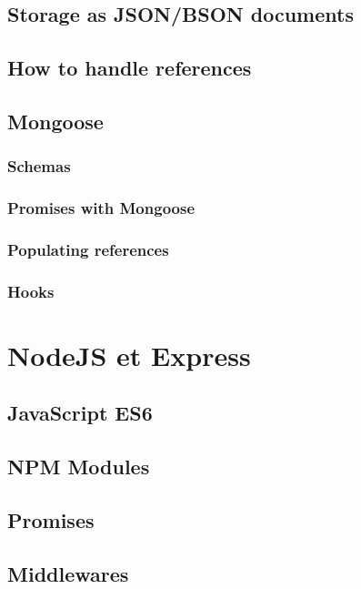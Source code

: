 \documentclass[11pt,a4paper]{report}
\begin{document}
\subsection{Storage as JSON/BSON documents}
\subsection{How to handle references}
\label{mongo_references}
\subsection{Mongoose}

\subsubsection{Schemas}
\subsubsection{Promises with Mongoose}
\subsubsection{Populating references}
\subsubsection{Hooks}
\label{mongoose_hooks}
\section{NodeJS et Express}
\subsection{JavaScript ES6}
\subsection{NPM Modules}
\subsection{Promises}
\subsection{Middlewares}
\end{document}
